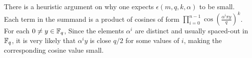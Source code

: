 \documentclass{amsart}
\begin{document}
\begin{remark}
There is a heuristic argument on why one expects $\epsilon(m,q,k,\alpha)$ to be small. Each term in the summand is a product of cosines of form $\prod_{i=0}^{n-1} \cos \left(\frac{ \alpha^i \pi y}{q} \right)^k$. For each $0 \neq y \in \mathbb{F}_q$, Since the elements $\alpha^i$ are distinct and usually spaced-out in $\mathbb{F}_q$, it is very likely that $\alpha^i y$ is close $q/2$ for some values of $i$, making the corresponding cosine value small.
\end{remark}



\end{document}
